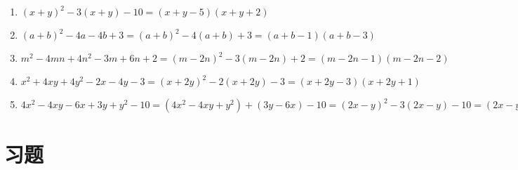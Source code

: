 \documentclass[cn,blue]{elegantbook}
\begin{document}
\begin{solution}
    \begin{enumerate}
        \item \((x+y)^2-3(x+y)-10=(x+y-5)(x+y+2)\)
        \item \((a+b)^2-4a-4b+3=(a+b)^2-4(a+b)+3=(a+b-1)(a+b-3)\)
        \item \(m^2-4mn+4n^2-3m+6n+2=(m-2n)^2-3(m-2n)+2=(m-2n-1)(m-2n-2)\)
        \item \(x^2 +4xy+4y^2-2x-4y-3=(x+2y)^2-2(x+2y)-3=(x+2y-3)(x+2y+1)\)
        \item \(4x^2-4xy-6x+3y+y^2-10=(4x^2-4xy+y^2)+(3y-6x)-10=(2x-y)^2-3(2x-y)-10=(2x-y-5)(2x-y+3)\)
    \end{enumerate}
\end{solution}

\section{习题}%
\label{sec:习题}
\end{document}
